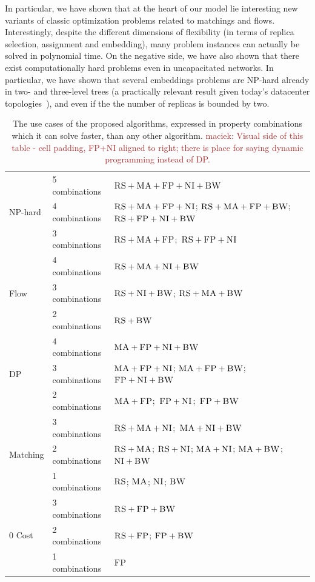 \documentclass[9pt]{sigcomm-alternate}
\newcommand{\maciek}[1]{\textcolor{brown}{maciek: #1}}
\newcommand{\CC}{\textsc{NI}}
\newcommand{\FP}{\textsc{FP}}
\newcommand{\RS}{\textsc{RS}}
\newcommand{\BW}{\textsc{BW}}
\newcommand{\MA}{\textsc{MA}}
\begin{document}
In particular, we have shown that
at the heart of our model lie interesting new variants of classic
optimization problems related to matchings and flows. Interestingly, despite the
different dimensions of flexibility (in terms of replica selection, assignment and embedding),
many problem instances can actually be solved in polynomial time.
On the negative side, we have also shown that there exist computationally hard
problems even in uncapacitated networks. In particular,
we have shown that several embeddings problems are NP-hard already in two- and three-level trees
(a practically relevant result given today's datacenter topologies~\cite{fattree}),
and even if the the number of replicas is bounded by two.
\begin{table}

\bgroup
\def\arraystretch{1.5}
\begin{small}
\begin{tabular}{|l|l|p{4cm}|}
\hline
\multirow{3}{*}{NP-hard} & 5 combinations & \mbox{$\RS+\MA+\FP+\CC+\BW$}\\
\cline{2-3}
 & 4 combinations &  \mbox{$\RS+\MA+\FP+\CC$}; \mbox{$\RS+\MA+\FP+\BW$};
\mbox{$\RS+\FP+\CC+\BW$} \\ \cline{2-3}
 & 3 combinations &\mbox{$\RS+\MA+\FP$};~\mbox{$\RS+\FP+\CC$} \\
 \hline
 \hline
\multirow{3}{*}{Flow} & 4 combinations & \mbox{$\RS+\MA+\CC+\BW$} \\ \cline{2-3}
 & 3 combinations & \mbox{$\RS+\CC+\BW$}; \mbox{$\RS+\MA+\BW$}    \\ \cline{2-3}
 & 2 combinations &$\RS+\BW$ \\
 \hline
 \hline
\multirow{3}{*}{DP} & 4 combinations & \mbox{$\MA+\FP+\CC+\BW$} \\ \cline{2-3}
 & 3 combinations &   \mbox{$\MA+\FP+\CC$};
\mbox{$\MA+\FP+\BW$}; \mbox{$\FP+\CC+\BW$} \\ \cline{2-3}
 & 2 combinations & \mbox{$\MA+\FP$};~\mbox{$\FP+\CC$};~\mbox{$\FP+\BW$} \\
 \hline
 \hline
\multirow{3}{*}{Matching} &3 combinations&
\mbox{$\RS+\MA+\CC$};~\mbox{$\MA+\CC+\BW$}  \\
\cline{2-3}
 & 2 combinations & \mbox{$\RS+\MA$};
\mbox{$\RS+\CC$}; \mbox{$\MA+\CC$};
\mbox{$\MA+\BW$}; \mbox{$\CC+\BW$} \\ \cline{2-3}
& 1 combinations & \mbox{$\RS$}; \mbox{$\MA$};
\mbox{$\CC$}; \mbox{$\BW$}\\
 \hline
 \hline
 \multirow{3}{*}{0 Cost} & 3 combinations & \mbox{$\RS+\FP+\BW$}\\
\cline{2-3}
 & 2 combinations & \mbox{$\RS+\FP$}; \mbox{$\FP+\BW$}\\ \cline{2-3}
 & 1 combinations & \mbox{$\FP$}\\
 \hline
\end{tabular}
\end{small}
\caption{
The use cases of the proposed algorithms, expressed in property
combinations which it can solve faster, than any other algorithm.
\maciek{Visual side of this table - cell padding, FP+NI aligned to right; there is place for saying dynamic programming instead of DP.}
}
\label{tab:summary}
\egroup
\end{table}
\end{document}
